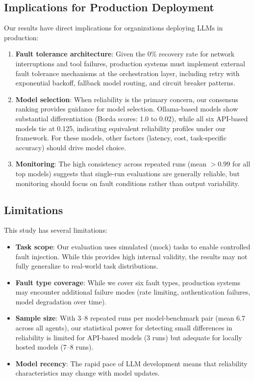 \subsection{Implications for Production Deployment}

Our results have direct implications for organizations deploying LLMs in production:

\begin{enumerate}
    \item \textbf{Fault tolerance architecture}: Given the 0\% recovery rate for network interruptions and tool failures, production systems must implement external fault tolerance mechanisms at the orchestration layer, including retry with exponential backoff, fallback model routing, and circuit breaker patterns.

    \item \textbf{Model selection}: When reliability is the primary concern, our consensus ranking provides guidance for model selection. Ollama-based models show substantial differentiation (Borda scores: 1.0 to 0.02), while all six API-based models tie at 0.125, indicating equivalent reliability profiles under our framework. For these models, other factors (latency, cost, task-specific accuracy) should drive model choice.

    \item \textbf{Monitoring}: The high consistency across repeated runs (mean $> 0.99$ for all top models) suggests that single-run evaluations are generally reliable, but monitoring should focus on fault conditions rather than output variability.
\end{enumerate}

\subsection{Limitations}

This study has several limitations:

\begin{itemize}
    \item \textbf{Task scope}: Our evaluation uses simulated (mock) tasks to enable controlled fault injection. While this provides high internal validity, the results may not fully generalize to real-world task distributions.

    \item \textbf{Fault type coverage}: While we cover six fault types, production systems may encounter additional failure modes (rate limiting, authentication failures, model degradation over time).

    \item \textbf{Sample size}: With 3--8 repeated runs per model-benchmark pair (mean 6.7 across all agents), our statistical power for detecting small differences in reliability is limited for API-based models (3 runs) but adequate for locally hosted models (7--8 runs).

    \item \textbf{Model recency}: The rapid pace of LLM development means that reliability characteristics may change with model updates.
\end{itemize}


